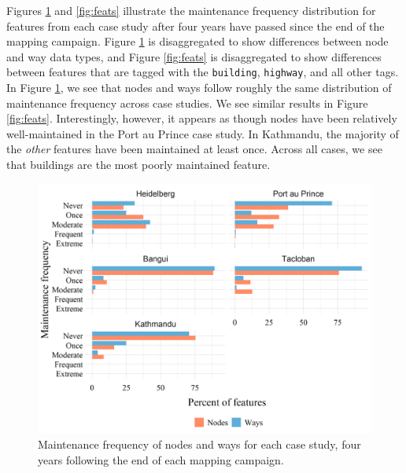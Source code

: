 Figures \ref{fig:types} and \ref{fig:feats} illustrate the maintenance frequency distribution for features from each case study after four years have passed since the end of the mapping campaign. Figure \ref{fig:types} is disaggregated to show differences between node and way data types, and Figure \ref{fig:feats} is disaggregated to show differences between features that are tagged with the \texttt{building}, \texttt{highway}, and all other tags. In Figure \ref{fig:types}, we see that nodes and ways follow roughly the same distribution of maintenance frequency across case studies. We see similar results in Figure \ref{fig:feats}. Interestingly, however, it appears as though nodes have been relatively well-maintained in the Port au Prince case study. In Kathmandu, the majority of the \textit{other} features have been maintained at least once. Across all cases, we see that buildings are the most poorly maintained feature. 

\begin{figure} %
    \centering %
    \includegraphics[width = \textwidth]{Images/typesmaint.png} %
    \caption{Maintenance frequency of nodes and ways for each case study, four years following the end of each mapping campaign.} %
    \label{fig:types} %
\end{figure}

